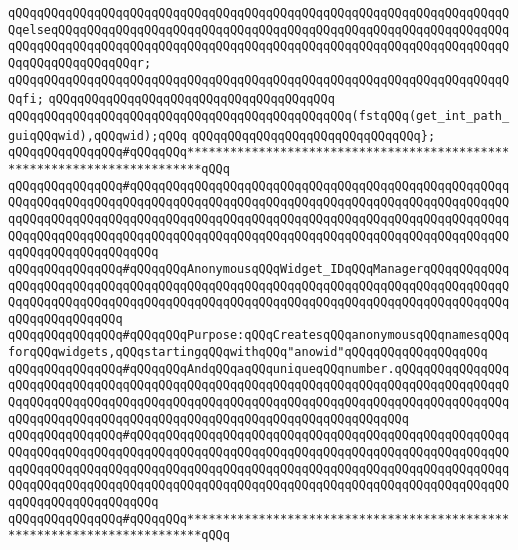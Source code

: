 \verb|qQQqqQQqqQQqqQQqqQQqqQQqqQQqqQQqqQQqqQQqqQQqqQQqqQQqqQQqqQQqqQQqqQQqqQQqelseqQQqqQQqqQQqqQQqqQQqqQQqqQQqqQQqqQQqqQQqqQQqqQQqqQQqqQQqqQQqqQQqqQQqqQQqqQQqqQQqqQQqqQQqqQQqqQQqqQQqqQQqqQQqqQQqqQQqqQQqqQQqqQQqqQQqqQQqqQQqqQQqqQQqqQQqr;|\newline
\verb|qQQqqQQqqQQqqQQqqQQqqQQqqQQqqQQqqQQqqQQqqQQqqQQqqQQqqQQqqQQqqQQqqQQqqQQqfi;|\newline
\verb|qQQqqQQqqQQqqQQqqQQqqQQqqQQqqQQqqQQqqQQq|\newline
\verb|qQQqqQQqqQQqqQQqqQQqqQQqqQQqqQQqqQQqqQQqqQQqqQQq(fstqQQq(get_int_path_guiqQQqwid),qQQqwid);qQQq|\newline
\verb|qQQqqQQqqQQqqQQqqQQqqQQqqQQqqQQq};|\newline
\newline
\newline
\verb|qQQqqQQqqQQqqQQq#qQQqqQQq************************************************************************qQQq|\newline
\verb|qQQqqQQqqQQqqQQq#qQQqqQQqqQQqqQQqqQQqqQQqqQQqqQQqqQQqqQQqqQQqqQQqqQQqqQQqqQQqqQQqqQQqqQQqqQQqqQQqqQQqqQQqqQQqqQQqqQQqqQQqqQQqqQQqqQQqqQQqqQQqqQQqqQQqqQQqqQQqqQQqqQQqqQQqqQQqqQQqqQQqqQQqqQQqqQQqqQQqqQQqqQQqqQQqqQQqqQQqqQQqqQQqqQQqqQQqqQQqqQQqqQQqqQQqqQQqqQQqqQQqqQQqqQQqqQQqqQQqqQQqqQQqqQQqqQQqqQQqqQQq|\newline
\verb|qQQqqQQqqQQqqQQq#qQQqqQQqAnonymousqQQqWidget_IDqQQqManagerqQQqqQQqqQQqqQQqqQQqqQQqqQQqqQQqqQQqqQQqqQQqqQQqqQQqqQQqqQQqqQQqqQQqqQQqqQQqqQQqqQQqqQQqqQQqqQQqqQQqqQQqqQQqqQQqqQQqqQQqqQQqqQQqqQQqqQQqqQQqqQQqqQQqqQQqqQQqqQQqqQQqqQQq|\newline
\verb|qQQqqQQqqQQqqQQq#qQQqqQQqPurpose:qQQqCreatesqQQqanonymousqQQqnamesqQQqforqQQqwidgets,qQQqstartingqQQqwithqQQq"anowid"qQQqqQQqqQQqqQQqqQQq|\newline
\verb|qQQqqQQqqQQqqQQq#qQQqqQQqAndqQQqaqQQquniqueqQQqnumber.qQQqqQQqqQQqqQQqqQQqqQQqqQQqqQQqqQQqqQQqqQQqqQQqqQQqqQQqqQQqqQQqqQQqqQQqqQQqqQQqqQQqqQQqqQQqqQQqqQQqqQQqqQQqqQQqqQQqqQQqqQQqqQQqqQQqqQQqqQQqqQQqqQQqqQQqqQQqqQQqqQQqqQQqqQQqqQQqqQQqqQQqqQQqqQQqqQQqqQQqqQQqqQQqqQQq|\newline
\verb|qQQqqQQqqQQqqQQq#qQQqqQQqqQQqqQQqqQQqqQQqqQQqqQQqqQQqqQQqqQQqqQQqqQQqqQQqqQQqqQQqqQQqqQQqqQQqqQQqqQQqqQQqqQQqqQQqqQQqqQQqqQQqqQQqqQQqqQQqqQQqqQQqqQQqqQQqqQQqqQQqqQQqqQQqqQQqqQQqqQQqqQQqqQQqqQQqqQQqqQQqqQQqqQQqqQQqqQQqqQQqqQQqqQQqqQQqqQQqqQQqqQQqqQQqqQQqqQQqqQQqqQQqqQQqqQQqqQQqqQQqqQQqqQQqqQQqqQQqqQQq|\newline
\verb|qQQqqQQqqQQqqQQq#qQQqqQQq************************************************************************qQQq|\newline
